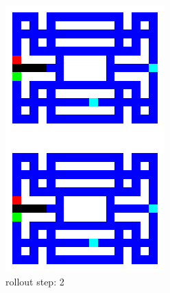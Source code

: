 \begin{figure}[H]
\begin{subfigure}[b]{0.16\textwidth}
        \includegraphics[width=\textwidth]{./Images/env_model_rollout_2.png}
  		\caption*{\footnotesize rollout step: 2} 
  		\label{fig:rollout_2}
    \end{subfigure} 
    \hspace{0mm}%
    \begin{subfigure}[b]{0.16\textwidth}

\end{subfigure}
\end{figure}

